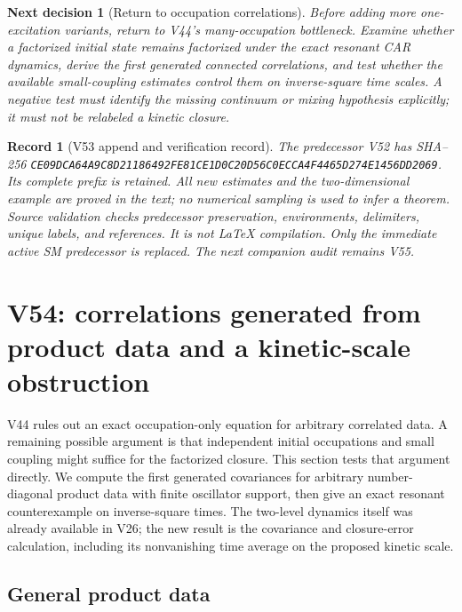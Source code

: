 \documentclass[11pt]{article}
\newtheorem{decision}[theorem]{Next decision}
\newtheorem{record}[theorem]{Record}
\theoremstyle{remark}
\begin{document}
\begin{decision}[Return to occupation correlations]
\label{dec:v20v53-next}
Before adding more one-excitation variants, return to V44's
many-occupation bottleneck.  Examine whether a factorized
initial state remains factorized under the exact resonant CAR
dynamics, derive the first generated connected correlations,
and test whether the available small-coupling estimates control
them on inverse-square time scales.  A negative test must identify
the missing continuum or mixing hypothesis explicitly; it must
not be relabeled a kinetic closure.
\end{decision}

\begin{record}[V53 append and verification record]
\label{rec:v20v53}
The predecessor V52 has SHA--256
\texttt{CE09DCA64A9C8D21186492FE81CE1D0C20D56C0ECCA4F4465D274E1456DD2069}.
Its complete prefix is retained.  All new estimates and the
two-dimensional example are proved in the text; no numerical
sampling is used to infer a theorem.  Source validation checks
predecessor preservation, environments, delimiters, unique labels,
and references.  It is not LaTeX compilation.
Only the immediate active SM predecessor is replaced.
The next companion audit remains V55.
\end{record}


\section{V54: correlations generated from product data and a kinetic-scale obstruction}
\label{sec:v20v54}

V44 rules out an exact occupation-only equation for arbitrary
correlated data.  A remaining possible argument is that independent
initial occupations and small coupling might suffice for the
factorized closure.  This section tests that argument directly.
We compute the first generated covariances for arbitrary
number-diagonal product data with finite oscillator support,
then give an exact resonant counterexample on inverse-square times.
The two-level dynamics itself was already available in V26;
the new result is the covariance and closure-error calculation,
including its nonvanishing time average on the proposed kinetic scale.

\subsection{General product data}
\end{document}
